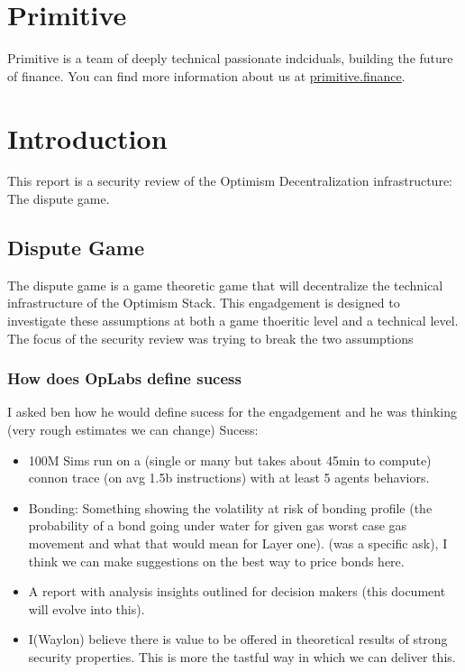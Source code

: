 \section{Primitive}\label{primitive}

Primitive is a team of deeply technical passionate indciduals, building
the future of finance.
You can find more information about us at \href{https://primitive.finance}{primitive.finance}.

\section{Introduction}\label{introduction}

This report is a security review of the Optimism Decentralization infrastructure: The dispute game.

\subsection{Dispute Game}\label{dispute-game}

The dispute game is a game theoretic game that will decentralize the technical infrastructure of the Optimism Stack.
This engadgement is designed to investigate these assumptions at both a game thoeritic level and a technical level.
The focus of the security review was trying to break the two assumptions

\subsubsection{How does OpLabs define sucess}
I asked ben how he would define sucess for the engadgement and he was thinking (very rough estimates we can change)
Sucess: 

\begin{itemize}
  \item 100M Sims run on a (single or many but takes about 45min to compute) connon trace (on avg 1.5b instructions) with at least 5 agents behaviors.
  \item Bonding: Something showing the volatility at risk of bonding profile (the probability of a bond going under water for given gas worst case gas movement and what that would mean for Layer one). (was a specific ask), I think we can make suggestions on the best way to price bonds here.
  \item A report with analysis insights outlined for decision makers (this document will evolve into this).
  \item I(Waylon) believe there is value to be offered in theoretical results of strong security properties. This is more the tastful way in which we can deliver this.
\end{itemize}

